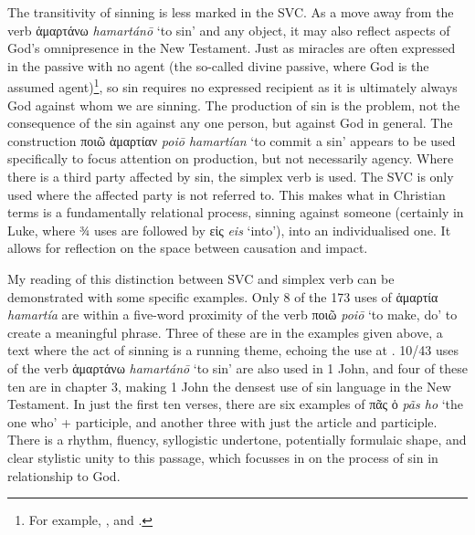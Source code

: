 \documentclass[output=paper,colorlinks,citecolor=brown]{langscibook}
\begin{document}
The transitivity of sinning is less marked in the SVC. 
As a move away
from the verb ἁμαρτάνω \textit{hamartánō} ‘to sin' and any object, it may also reflect aspects of God's omnipresence in the New Testament. 
Just as miracles are often
expressed in the passive with no agent (the so-called divine passive,
where God is the assumed agent)\footnote{For example, ,
  and .}, so sin requires no expressed recipient as it is
ultimately always God against whom we are sinning. 
The production of sin
is the problem, not the consequence of the sin against any one person,
but against God in general. 
The construction ποιῶ ἁμαρτίαν \textit{poiō hamartían} ‘to commit a sin' appears to be
used specifically to focus attention on production, but not necessarily
agency. Where there is a third party affected by sin, the simplex verb is
used. 
The SVC is only used where the affected party is not referred to.
This makes what in Christian terms is a fundamentally relational
process, sinning against someone (certainly in Luke, where ¾ uses are
followed by εἰς \textit{eis} ‘into'), into an individualised one. It allows for reflection
on the space between causation and impact.

My reading of this distinction between SVC and simplex verb can be
demonstrated with some specific examples. 
Only 8 of the 173 uses of
ἁμαρτία \textit{hamartía} are within a five-word proximity of the verb ποιῶ \textit{poiō} ‘to make, do' to create a
meaningful phrase. 
Three of these are in the  examples given above, a text where the act of sinning is a running
theme, echoing the use at . 
10/43 uses of the verb ἁμαρτάνω \textit{hamartánō} ‘to sin' are
also used in 1 John, and four of these ten are in chapter 3, making 1
John the densest use of sin language in the New Testament.
In just the
first ten verses, there are six examples of πᾶς ὁ \textit{pãs ho} ‘the one who' + participle, and
another three with just the article and participle. 
There is a rhythm,
fluency, syllogistic undertone, potentially formulaic shape, and clear
stylistic unity to this passage, which focusses in on the process of sin
in relationship to God.
\end{document}
